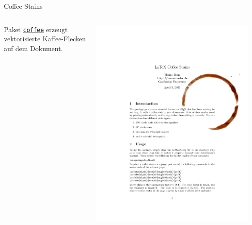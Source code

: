 \documentclass[
	vorläufig=false,
	datum=2022-12-22,
	titel={Witziges, Obskures und Sinnvolles…},
	web=false,
 	aspectratio=1610,
 	max,
]{../tex/latexkurs-slides}
\begin{document}
\begin{frame}{Coffee Stains}
	\begin{columns}
		\begin{column}{.5\textwidth}
			Paket \alert{\href{http://hanno-rein.de/archives/349}{\texttt{coffee}}} erzeugt vektorisierte Kaffee-Flecken auf dem Dokument.
		\end{column}
		\begin{column}{.5\textwidth}\vspace{-3.5em}
			\includegraphics[page=1,width=\textwidth]{coffee4.pdf}
		\end{column}
	\end{columns}
\end{frame}
\end{document}
